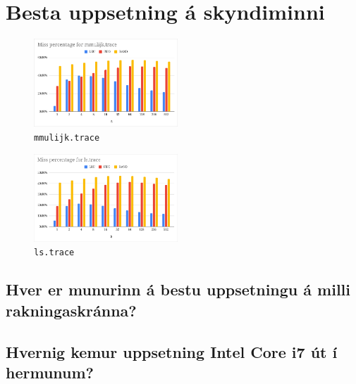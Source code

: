 \documentclass{article}
\begin{document}
	\newpage
	\section{Besta uppsetning á skyndiminni}
	\begin{multicols}{2}
	\begin{figure}[H]
		\begin{center}
			\includegraphics[width=0.48\textwidth]{mmul.png}
		\end{center}
		\caption{\texttt{mmulijk.trace}}\label{fig:mmul}
	\end{figure}
	\begin{figure}[H]
		\begin{center}
			\includegraphics[width=0.48\textwidth]{ls.png}
		\end{center}
		\caption{\texttt{ls.trace}}\label{fig:ls}
	\end{figure}
	\end{multicols}
	
	\subsection{Hver er munurinn á bestu uppsetningu á milli 
	rakningaskránna?}


	\subsection{Hvernig kemur uppsetning Intel Core i7 út í hermunum?}
	
\end{document}
